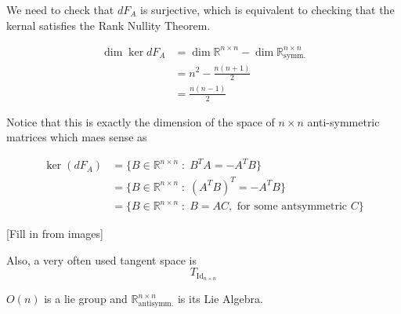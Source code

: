 \documentclass{article}
\newcommand{\R}{\mathbb{R}}
\begin{document}
We need to check that $dF_A$ is surjective, which is equivalent to checking that the kernal satisfies the Rank Nullity Theorem.

\begin{align*}
  \dim \ker dF_A &=\dim \R^{n \times n} - \dim \R^{n \times n}_{\text{symm.}} \\
  &= n^2 - \frac{n(n+1)}{2} \\
  &= \frac{n(n-1)}{2}
\end{align*}

Notice that this is exactly the dimension of the space of $n \times n$ anti-symmetric matrices which maes sense as 

\begin{align*}
  \ker (dF_A) &= \{  B \in \R^{n \times n} \;:\; B^T A = -A^T B \} \\
  &= \{  B \in \R^{n \times n} \;:\; \left(A^T B\right)^T = -A^T B \} \\
  &= \{ B \in \R^{n \times n} \;:\; B = A C, \text{ for some antsymmetric }C \}
\end{align*}

\vskip 0.5cm
[Fill in from images]

\vskip 0.5cm
Also, a very often used tangent space is 
\[ T_{{\text{Id}_{n \times n}}} \]

$O(n)$ is a lie group and $\R^{n \times n}_{\text{antisymm.}}$ is its Lie Algebra.
\end{document}
